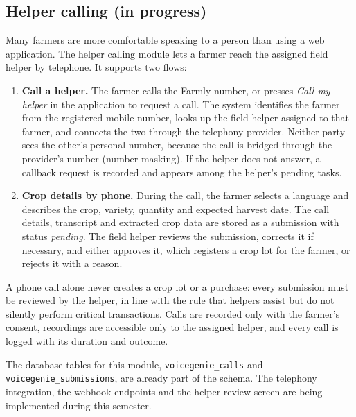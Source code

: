 \subsection*{Helper calling (in progress)}
Many farmers are more comfortable speaking to a person than using a web application. The helper calling module lets a farmer reach the assigned field helper by telephone. It supports two flows:
\begin{enumerate}
	\item \textbf{Call a helper.} The farmer calls the Farmly number, or presses \textit{Call my helper} in the application to request a call. The system identifies the farmer from the registered mobile number, looks up the field helper assigned to that farmer, and connects the two through the telephony provider. Neither party sees the other's personal number, because the call is bridged through the provider's number (number masking). If the helper does not answer, a callback request is recorded and appears among the helper's pending tasks.
	\item \textbf{Crop details by phone.} During the call, the farmer selects a language and describes the crop, variety, quantity and expected harvest date. The call details, transcript and extracted crop data are stored as a submission with status \textit{pending}. The field helper reviews the submission, corrects it if necessary, and either approves it, which registers a crop lot for the farmer, or rejects it with a reason.
\end{enumerate}
A phone call alone never creates a crop lot or a purchase: every submission must be reviewed by the helper, in line with the rule that helpers assist but do not silently perform critical transactions. Calls are recorded only with the farmer's consent, recordings are accessible only to the assigned helper, and every call is logged with its duration and outcome.

The database tables for this module, \texttt{voicegenie\_\allowbreak{}calls} and \texttt{voicegenie\_\allowbreak{}submissions}, are already part of the schema. The telephony integration, the webhook endpoints and the helper review screen are being implemented during this semester.

